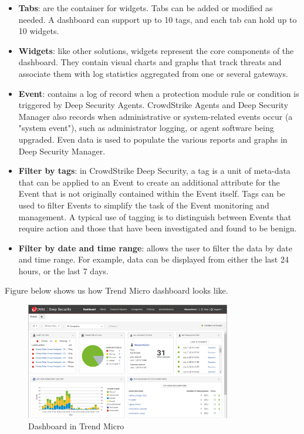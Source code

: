 \begin{itemize}
      \item \textbf{Tabs}: are the container for widgets. Tabs can be added or modified as needed. A dashboard
            can support up to 10 tags, and each tab can hold up to 10 widgets.
      \item \textbf{Widgets}: like other solutions, widgets represent the core components of the dashboard.
            They contain visual charts and graphs that track threats and associate them with log statistics
            aggregated from one or several gateways.
      \item \textbf{Event}: contains a log of record when a protection module rule or condition is triggered
            by Deep Security Agents. CrowdStrike Agents and Deep Security Manager also records when
            administrative or system-related events occur (a "system event"), such as administrator logging,
            or agent software being upgraded. Even data is used to populate the various reports and graphs
            in Deep Security Manager.
      \item \textbf{Filter by tags}: in CrowdStrike Deep Security\textregistered, a tag is a unit of meta-data
            that can be applied to an Event to create an additional attribute for the Event that is not
            originally contained within the Event itself. Tags can be used to filter Events to simplify
            the task of the Event monitoring and management. A typical use of tagging is to distinguish between
            Events that require action and those that have been investigated and found to be benign.
      \item \textbf{Filter by date and time range}: allows the user to filter the data by date and time range.
            For example, data can be displayed from either the last 24 hours, or the last 7 days.
\end{itemize}

Figure below shows us how Trend Micro dashboard looks like.

\begin{figure}[H]
      \centering
      \includegraphics[width=0.8\textwidth]{Figures/Trend Micro/dashboard-1.png}
      \caption{Dashboard in Trend Micro}
\end{figure}

